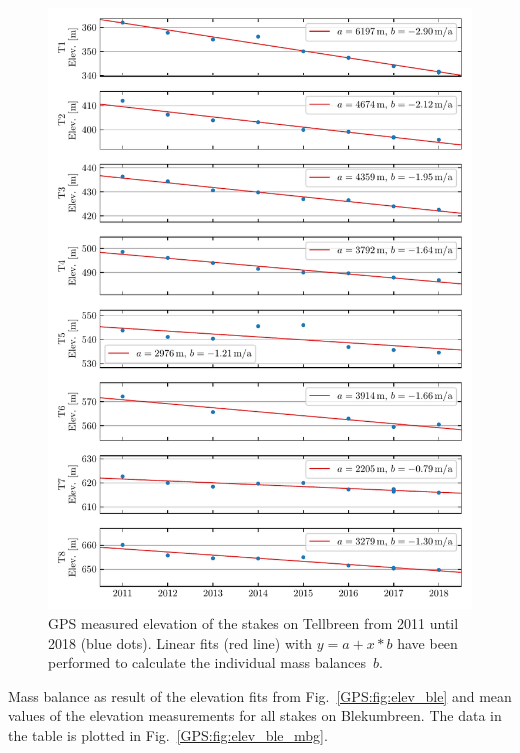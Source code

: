 \begin{figure}[htb]
    \centering
    \includegraphics[width=\textwidth]{./figs/Elevation_Tellbreen.pdf}
    \caption{GPS measured elevation of the stakes on Tellbreen from 2011 until 2018 (blue dots).
    Linear fits (red line) with $y = a + x*b$ have been performed to calculate the individual mass balances~$b$.}
    \label{GPS:fig:elev_tel}
\end{figure}

\begin{table}[htb]
	\caption{Mass balance as result of the elevation fits from Fig.~\ref{GPS:fig:elev_ble} and
	mean values of the elevation measurements for all stakes on Blekumbreen.
    The data in the table is plotted in Fig.~\ref{GPS:fig:elev_ble_mbg}.}
	\centering
	
	\label{GPS:tab:mbal_ble}
\end{table}


